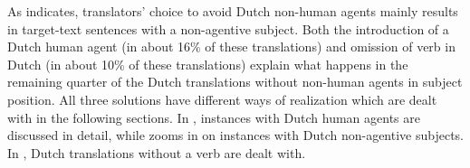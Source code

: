 \documentclass[output=paper]{LSP/langsci}
\begin{document}
\begin{table}
     \centering
     \caption{Solutions used to avoid \textsc{nl} non-human agents}
     \label{tab:5:3}
 
   \end{table}

As  indicates, translators’ choice to avoid Dutch non-human agents mainly results in target-text sentences with a non-agentive subject. Both the introduction of a Dutch human agent (in about 16\% of these translations) and omission of verb in Dutch (in about 10\% of these translations) explain what happens in the remaining quarter of the Dutch translations without non-human agents in subject position. All three solutions have different ways of realization which are dealt with in the following sections. In , instances with Dutch human agents are discussed in detail, while  zooms in on instances with Dutch non-agentive subjects. In , Dutch translations without a verb are dealt with.  
\end{document}
